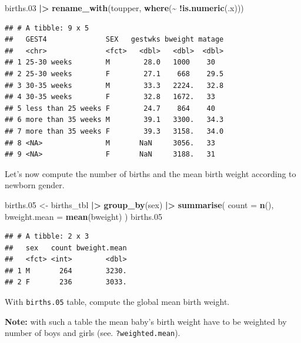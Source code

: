 \documentclass[
]{book}
\newenvironment{Shaded}{\begin{snugshade}}{\end{snugshade}}
\newcommand{\AttributeTok}[1]{\textcolor[rgb]{0.13,0.29,0.53}{#1}}
\newcommand{\FloatTok}[1]{\textcolor[rgb]{0.00,0.00,0.81}{#1}}
\newcommand{\FunctionTok}[1]{\textcolor[rgb]{0.13,0.29,0.53}{\textbf{#1}}}
\newcommand{\NormalTok}[1]{#1}
\newcommand{\OtherTok}[1]{\textcolor[rgb]{0.56,0.35,0.01}{#1}}
\newcommand{\SpecialCharTok}[1]{\textcolor[rgb]{0.81,0.36,0.00}{\textbf{#1}}}
\theoremstyle{definition}
\theoremstyle{definition}
\theoremstyle{definition}
\theoremstyle{definition}
\theoremstyle{remark}
\begin{document}
\begin{Shaded}
\begin{Highlighting}[]
\NormalTok{births}\FloatTok{.03} \SpecialCharTok{|\textgreater{}}
  \FunctionTok{rename\_with}\NormalTok{(toupper, }\FunctionTok{where}\NormalTok{(}\SpecialCharTok{\textasciitilde{}} \SpecialCharTok{!}\FunctionTok{is.numeric}\NormalTok{(.x)))}
\end{Highlighting}
\end{Shaded}

\begin{verbatim}
## # A tibble: 9 x 5
##   GEST4              SEX   gestwks bweight matage
##   <chr>              <fct>   <dbl>   <dbl>  <dbl>
## 1 25-30 weeks        M        28.0   1000    30  
## 2 25-30 weeks        F        27.1    668    29.5
## 3 30-35 weeks        M        33.3   2224.   32.8
## 4 30-35 weeks        F        32.8   1672.   33  
## 5 less than 25 weeks F        24.7    864    40  
## 6 more than 35 weeks M        39.1   3300.   34.3
## 7 more than 35 weeks F        39.3   3158.   34.0
## 8 <NA>               M       NaN     3056.   33  
## 9 <NA>               F       NaN     3188.   31
\end{verbatim}

Let's now compute the number of births and the mean birth weight according to newborn gender.

\begin{Shaded}
\begin{Highlighting}[]
\NormalTok{births}\FloatTok{.05} \OtherTok{\textless{}{-}}
\NormalTok{  births\_tbl }\SpecialCharTok{|\textgreater{}}
  \FunctionTok{group\_by}\NormalTok{(sex) }\SpecialCharTok{|\textgreater{}}
  \FunctionTok{summarise}\NormalTok{(}
    \AttributeTok{count =} \FunctionTok{n}\NormalTok{(),}
    \AttributeTok{bweight.mean =} \FunctionTok{mean}\NormalTok{(bweight)}
\NormalTok{  )}
\NormalTok{births}\FloatTok{.05}
\end{Highlighting}
\end{Shaded}

\begin{verbatim}
## # A tibble: 2 x 3
##   sex   count bweight.mean
##   <fct> <int>        <dbl>
## 1 M       264        3230.
## 2 F       236        3033.
\end{verbatim}

With \texttt{births.05} table, compute the global mean birth weight.

\textbf{Note:} with such a table the mean baby's birth weight have to be weighted by number of boys and girls (see. \texttt{?weighted.mean}).
\end{document}
